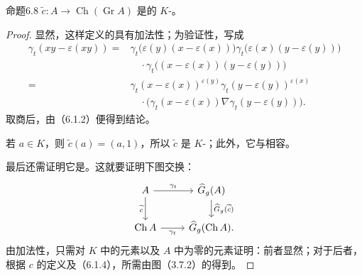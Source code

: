 \begin{SGAresult}{命题}{6.8}
$\widetilde c:A\longrightarrow\operatorname{Ch}(\operatorname{Gr}A)$ 是的 $K$-。
\end{SGAresult}
\begin{proof}
显然，这样定义的具有加法性；为验证性，写成
\[
\begin{aligned}
\gamma_t(xy-\varepsilon(xy))
={}&\gamma_t\bigl(\varepsilon(y)(x-\varepsilon(x))\bigr)
 \gamma_t\bigl(\varepsilon(x)(y-\varepsilon(y))\bigr)\\
&\hspace{1em}\cdot\gamma_t\bigl((x-\varepsilon(x))(y-\varepsilon(y))\bigr)\\
={}&\gamma_t(x-\varepsilon(x))^{\varepsilon(y)}
 \gamma_t(y-\varepsilon(y))^{\varepsilon(x)}\\
&\hspace{1em}\cdot\bigl(\gamma_t(x-\varepsilon(x))\nabla
 \gamma_t(y-\varepsilon(y))\bigr).
\end{aligned}
\]
取商后，由（6.1.2）便得到结论。

若 $a\in K$，则 $\widetilde c(a)=(a,1)$，所以 $\widetilde c$ 是 $K$-；此外，它与相容。

最后还需证明它是。这就要证明下图交换：
\[
\begin{tikzcd}
A \arrow[r,"\gamma_t"] \arrow[d,"\widetilde c"'] &
 \widehat G_g(A) \arrow[d,"\widehat G_g(\widetilde c)"]\\
\operatorname{Ch}A \arrow[r,"\gamma_t"'] &
 \widehat G_g(\operatorname{Ch}A).
\end{tikzcd}
\]
由加法性，只需对 $K$ 中的元素以及 $A$ 中为零的元素证明：前者显然；对于后者，根据 $c$ 的定义及（6.1.4），所需由图（3.7.2）的得到。
\end{proof}

